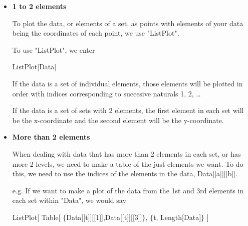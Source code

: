 \documentclass[11pt,a4paper,twoside]{article}
\begin{document}
				\begin{itemize}
			
					\item %
					
						\textbf{1 to 2 elements}
				
						To plot the data, or elements of a set, as points with elements of your data being the coordinates of each point, we use "ListPlot".
				
						To use "ListPlot", we enter
				
						\begin{center} ListPlot[Data] \end{center}
				
						If the data is a set of individual elements, those elements will be plotted in order with indices corresponding to succesive naturals 1, 2, \dots 
				
						If the data is a set of sets with 2 elements, the first element in each set will be the x-coordinate and the second element will be the y-coordinate.
						
					\item %
				
						\textbf{More than 2 elements}
						
						When dealing with data that has more than 2 elements in each set, or has more 2 levels, we need to make a table of the just elements we want.  To do this, we need to use the indices of the elements in the data, Data[[a]][[b]].
						
						e.g. If we want to make a plot of the data from the 1st and 3rd elements in each set within "Data", we would say
						
						\begin{center}
						
							ListPlot[
								Table[ $ \{ $Data[[t]][[1]],Data[[t]][[3]]$ \} $, $ \{ $t, Length[Data]$ \} $
							]
						
						\end{center}
						

\end{itemize}
\end{document}
